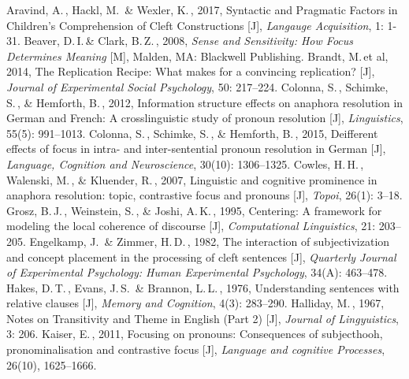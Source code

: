 \begin{thebibliography}{99}

Aravind, A.\,, Hackl, M.\, \& Wexler, K.\,, 2017, Syntactic and Pragmatic Factors in Children's Comprehension of Cleft Constructions [J], \emph{Langauge Acquisition}, 1: 1-31.
	Beaver, D.\,I.\,\& Clark, B.\,Z.\,, 2008, \emph{Sense and Sensitivity: How Focus Determines Meaning} [M], Malden, MA: Blackwell Publishing.
	Brandt, M.\,et al, 2014, The Replication Recipe: What makes for a convincing replication? [J], \emph{Journal of Experimental Social Psychology}, 50: 217--224.
	Colonna, S.\,, Schimke, S.\,, \& Hemforth, B.\,, 2012, Information structure effects on anaphora resolution in German and French: A crosslinguistic study of pronoun resolution [J], \emph{Linguistics}, 55(5): 991--1013.
	Colonna, S.\,, Schimke, S.\,, \& Hemforth, B.\,, 2015, Deifferent effects of focus in intra- and inter-sentential pronoun resolution in German [J], \emph{Language, Cognition and Neuroscience}, 30(10): 1306--1325.
	Cowles, H.\,H.\,, Walenski, M.\,, \& Kluender, R.\,, 2007, Linguistic and cognitive prominence in anaphora resolution: topic, contrastive focus and pronouns [J], \emph{Topoi}, 26(1): 3--18.
	Grosz, B.\,J.\,, Weinstein, S.\,, \& Joshi, A.\,K.\,, 1995, Centering: A framework for modeling the local coherence of discourse [J], \emph{Computational Linguistics}, 21: 203--205.
	Engelkamp, J.\, \& Zimmer, H.\,D.\,, 1982, The interaction of subjectivization and concept placement in the processing of cleft sentences [J], \emph{Quarterly Journal of Experimental Psychology: Human Experimental Psychology}, 34(A): 463--478.
	Hakes, D.\,T.\,, Evans, J.\,S.\, \& Brannon, L.\,L.\,, 1976, Understanding sentences with relative clauses [J], \emph{Memory and Cognition}, 4(3): 283--290.
	Halliday, M.\,, 1967, Notes on Transitivity and Theme in English (Part 2) [J], \emph{Journal of Lingyuistics}, 3: 206.
	Kaiser, E.\,, 2011, Focusing on pronouns: Consequences of subjecthooh, pronominalisation and contrastive focus [J], \emph{Language and cognitive Processes}, 26(10), 1625--1666.

\end{thebibliography}

